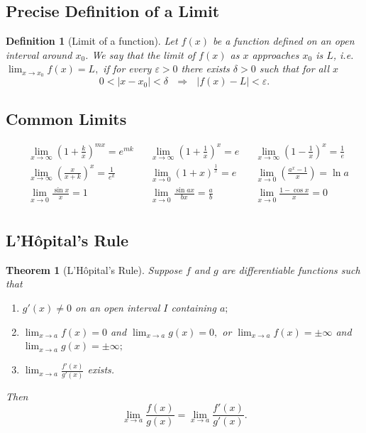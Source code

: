 \documentclass[12pt]{article}
\newtheorem{thrm}{Theorem}
\newtheorem{defn}{Definition}
\begin{document}
\subsection{Precise Definition of a Limit}
\begin{defn}[Limit of a function]
	Let $f(x)$ be a function defined on an open interval around $x_0$. We say that the limit of $f(x)$ as $x$ approaches $x_0$ is $L$, i.e.
	$\lim _{ x \to x_{0} }{f(x) } = L,$	if for every $\varepsilon > 0 $ there exists $\delta >0$ such that for all $x$
	$$0 < \left| x - x_{0} \right |<\delta \textrm{ } \Rightarrow \textrm{ } \left |f(x) - L \right| < \varepsilon.$$
\end{defn}
\subsection{Common Limits}
\begin{align*}
&\lim_{x \to \infty}{\left(1 + \frac{k}{x}\right)}^{mx} = e^{mk} & &\lim_{x \to \infty}{\left(1 + \frac{1}{x}\right)}^{x} = e & &\lim_{x \to \infty}{\left(1 - \frac{1}{x}\right)}^{x} = \frac{1}{e}\\
&\lim_{x \to \infty}{\left(\frac{x}{x+k}\right)}^{x} = \frac{1}{e^k} & &\lim_{x \to 0}{\left(1 + x\right)}^{\frac{1}{x}} = e & &\lim_{x \to 0}{\left(\frac{a^x - 1}{x}\right)} = \ln a \\ 
&\lim_{x \to 0}{\frac{\sin x}{x}} = 1 & &\lim_{x \to 0}{\frac{\sin{ax}}{bx}} = \frac{a}{b} & &\lim_{x \to 0}{\frac{1 - \cos x}{x}} = 0 \\
\end{align*}

\subsection{L'H\^{o}pital's Rule}
\begin{thrm}[L'H\^{o}pital's Rule]
	Suppose $f$ and $g$ are differentiable functions such that
\begin{enumerate}
	\item $g'(x) \neq 0$ on an open interval  $I$ containing $a;$
	\item $\lim_{x\to a} f(x) = 0$ and $\lim_{x\to a} g(x) = 0,$ or $\lim_{x\to a} f(x) = \pm \infty$ and $\lim_{x\to a} g(x) = \pm \infty;$
	\item $\lim_{x\to a} \frac{f'(x)}{g'(x)}$ exists.
\end{enumerate}
	Then
	$$\lim_{x\to a} \frac{f(x)}{g(x)} = \lim_{x\to a} \frac{f'(x)}{g'(x)}.$$
\end{thrm}
\end{document}
